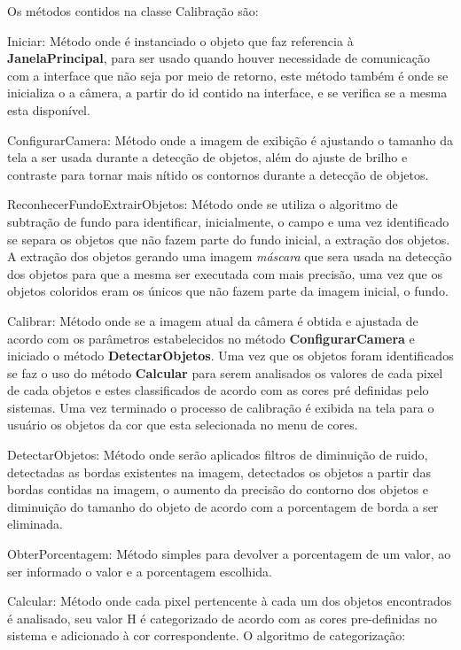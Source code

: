 Os métodos contidos na classe Calibração são:
	\begin{description}

\item Iniciar: Método onde é instanciado o objeto que faz referencia à \textbf{JanelaPrincipal}, para ser usado quando houver necessidade de comunicação com a interface que não seja por meio de retorno, este método também é onde se inicializa o a câmera, a partir do id contido na interface, e se verifica se a mesma esta disponível.


\item ConfigurarCamera: Método onde a imagem de exibição é ajustando o tamanho da tela a ser usada durante a detecção de objetos, além do ajuste de brilho e contraste para tornar mais nítido os contornos durante a detecção de objetos.	
	
  \item ReconhecerFundoExtrairObjetos: Método onde se utiliza o algoritmo de subtração de fundo para identificar, inicialmente, o campo e uma vez identificado se separa os objetos que não fazem parte do fundo inicial, a extração dos objetos. A extração dos objetos gerando uma imagem \textit{máscara} que sera usada na detecção dos objetos para que a mesma ser executada com mais precisão, uma vez que os objetos coloridos eram os únicos que não fazem parte da imagem inicial, o fundo.
  
 
	\item Calibrar: Método onde se a imagem atual da câmera é obtida e ajustada de acordo com os parâmetros estabelecidos no método \textbf{ConfigurarCamera} e iniciado o método \textbf{DetectarObjetos}. Uma vez que os objetos foram identificados se faz o uso do método \textbf{Calcular}  para serem analisados os valores de cada pixel de cada objetos e estes classificados de acordo com as cores pré definidas pelo sistemas. Uma vez terminado o processo de calibração é exibida na tela para o usuário os objetos da cor que esta selecionada no menu de cores.			
		
	\item DetectarObjetos: Método onde serão aplicados filtros de diminuição de ruido, detectadas as bordas existentes na imagem, detectados os objetos a partir das bordas contidas na imagem, o aumento da precisão do contorno dos objetos e diminuição do tamanho do objeto de acordo com a porcentagem de borda a ser eliminada. 

	\item ObterPorcentagem: Método simples para devolver a porcentagem de um valor, ao ser informado o valor e a porcentagem escolhida.
		
		\item Calcular: Método onde cada pixel pertencente à cada um dos objetos encontrados é analisado, seu valor H é categorizado de acordo com as cores pre-definidas no sistema e adicionado à cor correspondente.
		O algoritmo de categorização:
 
	
		\end{description}	


